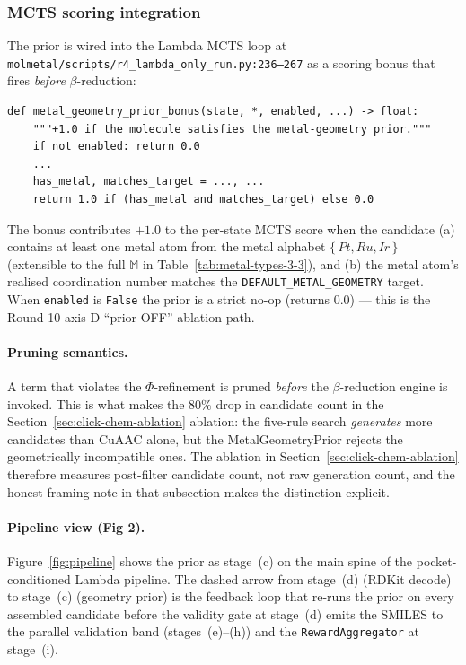 \subsubsection{MCTS scoring integration}
\label{sec:mcts-geometry-scoring}

The prior is wired into the Lambda MCTS loop at
\texttt{molmetal/scripts/r4\_lambda\_only\_run.py:236--267} as a
scoring bonus that fires \emph{before} $\beta$-reduction:
\begin{verbatim}
def metal_geometry_prior_bonus(state, *, enabled, ...) -> float:
    """+1.0 if the molecule satisfies the metal-geometry prior."""
    if not enabled: return 0.0
    ...
    has_metal, matches_target = ..., ...
    return 1.0 if (has_metal and matches_target) else 0.0
\end{verbatim}
The bonus contributes $+1.0$ to the per-state MCTS score when the
candidate (a) contains at least one metal atom from the metal
alphabet $\{\,Pt, Ru, Ir\,\}$ (extensible to the full
$\mathbb{M}$ in Table~\ref{tab:metal-types-3-3}), and (b) the
metal atom's realised coordination number matches the
\texttt{DEFAULT\_METAL\_GEOMETRY} target. When \texttt{enabled} is
\texttt{False} the prior is a strict no-op (returns 0.0) --- this
is the Round-10 axis-D ``prior OFF'' ablation path.

\paragraph{Pruning semantics.}
A term that violates the $\Phi$-refinement is pruned \emph{before}
the $\beta$-reduction engine is invoked. This is what makes the
$80\%$ drop in candidate count in the
Section~\ref{sec:click-chem-ablation} ablation: the five-rule
search \emph{generates} more candidates than CuAAC alone, but the
MetalGeometryPrior rejects the geometrically incompatible ones.
The ablation in
Section~\ref{sec:click-chem-ablation} therefore measures
post-filter candidate count, not raw generation count, and the
honest-framing note in that subsection makes the distinction
explicit.

\paragraph{Pipeline view (Fig 2).}
Figure~\ref{fig:pipeline} shows the prior as stage~(c) on the
main spine of the pocket-conditioned Lambda pipeline. The dashed
arrow from stage~(d) (RDKit decode) to stage~(c) (geometry
prior) is the feedback loop that re-runs the prior on every
assembled candidate before the validity gate at stage~(d) emits
the SMILES to the parallel validation band (stages~(e)--(h)) and
the \texttt{RewardAggregator} at stage~(i).

